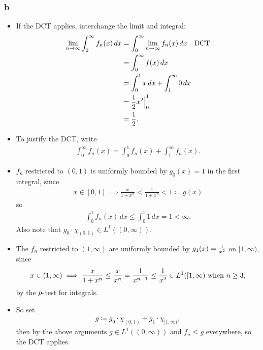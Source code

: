 \begin{solution}
\hypertarget{b-7}{%
\subsubsection{b}\label{b-7}}

\begin{itemize}
\item
  If the DCT applies, interchange the limit and integral:
  \begin{align*}
    \lim_{n\to\infty }\int_0^\infty f_n(x)\, dx 
  &= \int_0^\infty \lim_{n\to\infty}f_n(x) \, dx \quad\text{DCT}\\
    &=\int_0^\infty f(x) \,dx \\
    &= \int_0^1 x \,dx + \int_1^\infty 0\, dx \\
    &= {1\over 2}x^2 \Big|_0^1 \\
    &= {1\over 2}
    .\end{align*}
\item
  To justify the DCT, write
  \begin{align*}
  \int_0^\infty f_n(x)
  = \int_0^1 f_n(x) + \int_1^\infty f_n(x)
  .\end{align*}
\item
  \(f_n\) restricted to \((0, 1)\) is uniformly bounded by
  \(g_0(x) = 1\) in the first integral, since
  \begin{align*}
  x \in [0, 1] \implies \frac{x}{1+x^n} < \frac{1}{1+x^n} < 1 \coloneqq g(x)
  \end{align*}
  so
  \begin{align*}
  \int_0^1 f_n(x)\,dx \leq \int_0^1 1 \,dx = 1 < \infty
  .\end{align*}
  Also note that \(g_0\cdot \chi_{(0, 1)} \in L^1((0, \infty))\).
\item
  The \(f_n\) restricted to \((1, \infty)\) are uniformly bounded by
  \(g_1(x) = {1\over x^{2}}\) on \([1, \infty)\), since
  \begin{align*}
  x \in (1, \infty) \implies \frac{x}{1+x^n} \leq {x \over x^n} = {1 \over x^{n-1}} \leq {1\over x^2}\in L^1([1, \infty) \text{ when } n\geq 3
  ,\end{align*}
  by the \(p{\hbox{-}}\)test for integrals.
\item
  So set
  \begin{align*}g \coloneqq g_0 \cdot \chi_{(0, 1)} + g_1 \cdot \chi_{[1, \infty)},\end{align*}
  then by the above arguments \(g \in L^1((0, \infty))\) and
  \(f_n \leq g\) everywhere, so the DCT applies.
\end{itemize}

\end{solution}

